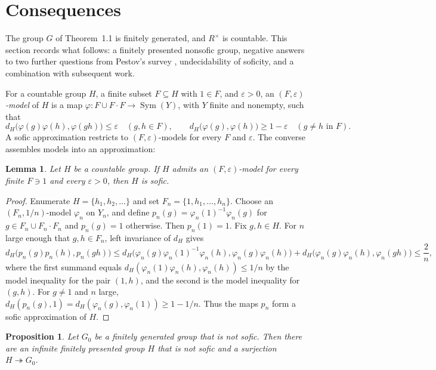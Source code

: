 \documentclass[10pt]{article}
\newtheorem{proposition}[theorem]{Proposition}
\newtheorem{lemma}[theorem]{Lemma}
\newcommand{\Sym}{\operatorname{Sym}}
\begin{document}
\section{Consequences}

The group $G$ of Theorem~1.1 is finitely generated, and $R^\times$ is countable. This section records what follows: a finitely presented nonsofic group, negative answers to two further questions from Pestov's survey \cite{Pes08}, undecidability of soficity, and a combination with subsequent work.

For a countable group $H$, a finite subset $F\subseteq H$ with $1\in F$, and $\varepsilon>0$, an \emph{$(F,\varepsilon)$-model} of $H$ is a map $\varphi:F\cup F\!\cdot\!F\to\Sym(Y)$, with $Y$ finite and nonempty, such that
\[
d_H\bigl(\varphi(g)\varphi(h),\varphi(gh)\bigr)\leq\varepsilon\quad(g,h\in F),
\qquad
d_H\bigl(\varphi(g),\varphi(h)\bigr)\geq1-\varepsilon\quad(g\neq h\text{ in }F).
\]
A sofic approximation restricts to $(F,\varepsilon)$-models for every $F$ and $\varepsilon$. The converse assembles models into an approximation:

\begin{lemma}
Let $H$ be a countable group. If $H$ admits an $(F,\varepsilon)$-model for every finite $F\ni1$ and every $\varepsilon>0$, then $H$ is sofic.
\end{lemma}

\begin{proof}
Enumerate $H=\{h_1,h_2,\dots\}$ and set $F_n=\{1,h_1,\dots,h_n\}$. Choose an $(F_n,1/n)$-model $\varphi_n$ on $Y_n$, and define $p_n(g)=\varphi_n(1)^{-1}\varphi_n(g)$ for $g\in F_n\cup F_n\!\cdot\!F_n$ and $p_n(g)=1$ otherwise. Then $p_n(1)=1$. Fix $g,h\in H$. For $n$ large enough that $g,h\in F_n$, left invariance of $d_H$ gives
\[
d_H\bigl(p_n(g)p_n(h),p_n(gh)\bigr)
\leq d_H\bigl(\varphi_n(g)\varphi_n(1)^{-1}\varphi_n(h),\varphi_n(g)\varphi_n(h)\bigr)
+d_H\bigl(\varphi_n(g)\varphi_n(h),\varphi_n(gh)\bigr)\leq\frac2n,
\]
where the first summand equals $d_H(\varphi_n(1)\varphi_n(h),\varphi_n(h))\leq1/n$ by the model inequality for the pair $(1,h)$, and the second is the model inequality for $(g,h)$. For $g\neq1$ and $n$ large, $d_H(p_n(g),1)=d_H(\varphi_n(g),\varphi_n(1))\geq1-1/n$. Thus the maps $p_n$ form a sofic approximation of $H$.
\end{proof}

\begin{proposition}
Let $G_0$ be a finitely generated group that is not sofic. Then there are an infinite finitely presented group $H$ that is not sofic and a surjection $H\twoheadrightarrow G_0$.
\end{proposition}
\end{document}

